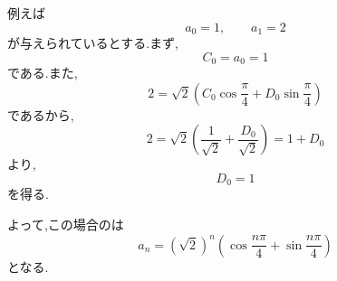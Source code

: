   例えば
  \[
    a_0=1,\qquad a_1=2
  \]
  が与えられているとする.まず,
  \[
    C_0=a_0=1
  \]
  である.また,
  \[
    2=\sqrt{2}
    \left(
      C_0\cos\frac{\pi}{4}
      +D_0\sin\frac{\pi}{4}
    \right)
  \]
  であるから,
  \[
    2=\sqrt{2}
    \left(
      \frac{1}{\sqrt{2}}
      +\frac{D_0}{\sqrt{2}}
    \right)
    =1+D_0
  \]
  より,
  \[
    D_0=1
  \]
  を得る.

  よって,この場合のは
  \[
    a_n=(\sqrt{2})^n
    \left(
      \cos\frac{n\pi}{4}
      +\sin\frac{n\pi}{4}
    \right)
  \]
  となる.
